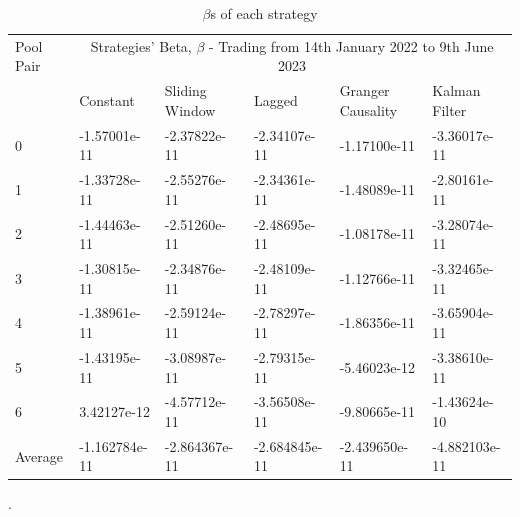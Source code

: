\begin{table}[!htb]
    \centering
    \begin{adjustwidth}{-0.8in}{-0.9in}
        \begin{tabular}{|p{5em}|p{7em}|p{7em}|p{7em}|p{8em}|p{7em}|}\hline
            Pool Pair & \multicolumn{5}{|c|}{Strategies' Beta, $\beta$ - Trading from 14th January 2022 to 9th June 2023} \\\cline{1-6}
            & Constant & Sliding Window & Lagged & Granger Causality & Kalman Filter\\\cline{2-6}
            0 & -1.57001e-11 & -2.37822e-11 & -2.34107e-11 & -1.17100e-11 & -3.36017e-11\\\cline{2-6}
            1 & -1.33728e-11 & -2.55276e-11 & -2.34361e-11 & -1.48089e-11 & -2.80161e-11\\\cline{2-6}
            2 & -1.44463e-11 & -2.51260e-11 & -2.48695e-11 & -1.08178e-11 & -3.28074e-11\\\cline{2-6}
            3 & -1.30815e-11 & -2.34876e-11 & -2.48109e-11 & -1.12766e-11 & -3.32465e-11\\\cline{2-6}
            4 & -1.38961e-11 & -2.59124e-11 & -2.78297e-11 & -1.86356e-11 & -3.65904e-11\\\cline{2-6}
            5 & -1.43195e-11 & -3.08987e-11 & -2.79315e-11 & -5.46023e-12 & -3.38610e-11\\\cline{2-6}
            6 & 3.42127e-12 & -4.57712e-11 & -3.56508e-11 & -9.80665e-11 & -1.43624e-10\\\hline\hline
            Average & -1.162784e-11 & -2.864367e-11 & -2.684845e-11 & -2.439650e-11 & -4.882103e-11\\\hline
        \end{tabular}
    \end{adjustwidth}
    \caption{$\beta$s of each strategy \label{tab:betas}}.
\end{table}

